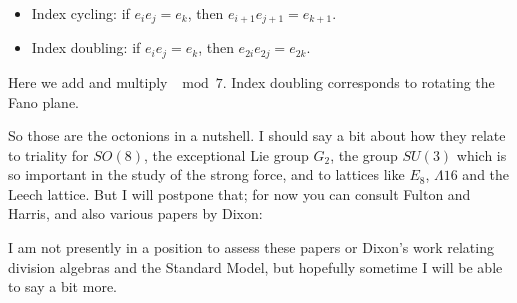 \documentclass{article}
\def\tightlist{}
\renewcommand{\texttt}[1]{%
  \begingroup
  \ttfamily
  \begingroup\lccode`~=`/\lowercase{\endgroup\def~}{/\discretionary{}{}{}}%
  \begingroup\lccode`~=`[\lowercase{\endgroup\def~}{[\discretionary{}{}{}}%
  \begingroup\lccode`~=`.\lowercase{\endgroup\def~}{.\discretionary{}{}{}}%
  \catcode`/=\active\catcode`[=\active\catcode`.=\active
  \scantokens{#1\noexpand}%
  \endgroup
}
\begin{document}
\begin{itemize}
\tightlist
\item
  Index cycling: if \(e_i e_j = e_k\), then
  \(e_{i+1} e_{j+1} = e_{k+1}\).
\item
  Index doubling: if \(e_i e_j = e_k\), then \(e_{2i} e_{2j} = e_{2k}\).
\end{itemize}

Here we add and multiply \(\mod 7\). Index doubling corresponds to
rotating the Fano plane.

So those are the octonions in a nutshell. I should say a bit about how
they relate to triality for \(SO(8)\), the exceptional Lie group
\(G_2\), the group \(SU(3)\) which is so important in the study of the
strong force, and to lattices like \(E_8\), \(\Lambda 16\) and the Leech
lattice. But I will postpone that; for now you can consult Fulton and
Harris, and also various papers by Dixon:


I am not presently in a position to assess these papers or Dixon's work
relating division algebras and the Standard Model, but hopefully
sometime I will be able to say a bit more.
\end{document}
